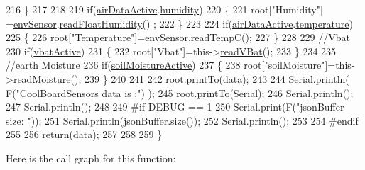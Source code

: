 \begin{DoxyCode}
216     \}
217     
218         
219     \textcolor{keywordflow}{if}(\hyperlink{class_cool_board_sensors_abff8dfeccb2f7689847bb64d5f1cd31e}{airDataActive}.\hyperlink{struct_cool_board_sensors_1_1air_active_ab69738e9fd1c2ba80dc666bcd1e116f7}{humidity}) 
220     \{   
221         root[\textcolor{stringliteral}{"Humidity"}] =\hyperlink{class_cool_board_sensors_a868e38985e9a2412829fa2790ca13e2e}{envSensor}.\hyperlink{class_b_m_e280_a42ea7232039eebf5aadb391ef6132c35}{readFloatHumidity}() ;
222     \}   
223     
224     \textcolor{keywordflow}{if}(\hyperlink{class_cool_board_sensors_abff8dfeccb2f7689847bb64d5f1cd31e}{airDataActive}.\hyperlink{struct_cool_board_sensors_1_1air_active_ac08576736c7ac3bfbfec32e5ee17c686}{temperature})
225     \{
226         root[\textcolor{stringliteral}{"Temperature"}]=\hyperlink{class_cool_board_sensors_a868e38985e9a2412829fa2790ca13e2e}{envSensor}.\hyperlink{class_b_m_e280_afffdd1d7ded9e1f92200e70669019d97}{readTempC}();
227     \}
228     
229     \textcolor{comment}{//Vbat}
230     \textcolor{keywordflow}{if}(\hyperlink{class_cool_board_sensors_ab0b4bbae83796b52b90f91008d383583}{vbatActive})    
231     \{   
232         root[\textcolor{stringliteral}{"Vbat"}]=this->\hyperlink{class_cool_board_sensors_a6944b6ea7bce8e2fce1b434acfd9d5f3}{readVBat}();
233     \}
234     
235     \textcolor{comment}{//earth Moisture}
236     \textcolor{keywordflow}{if}(\hyperlink{class_cool_board_sensors_ae7971bf527781ac4994309591b78ab89}{soilMoistureActive})
237     \{   
238         root[\textcolor{stringliteral}{"soilMoisture"}]=this->\hyperlink{class_cool_board_sensors_a8761bff50373c485f4465c8db47d0633}{readMoisture}();
239     \}
240     
241     
242     root.printTo(data);
243 
244     Serial.println( F(\textcolor{stringliteral}{"CoolBoardSensors data is :"}) );
245     root.printTo(Serial);
246     Serial.println();
247     Serial.println();
248 
249 \textcolor{preprocessor}{#if DEBUG == 1}
250     Serial.print(F(\textcolor{stringliteral}{"jsonBuffer size: "}));
251     Serial.println(jsonBuffer.size());
252     Serial.println();
253 
254 \textcolor{preprocessor}{#endif}
255 
256     \textcolor{keywordflow}{return}(data);   
257     
258 
259 \}
\end{DoxyCode}
Here is the call graph for this function\+:\nopagebreak
